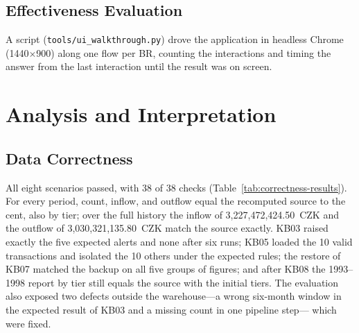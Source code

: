 \documentclass[peerreview]{IEEEtran}
\begin{document}
\subsection{Effectiveness Evaluation}
A script (\texttt{tools/ui\_walkthrough.py}) drove the application in headless Chrome
(1440$\times$900) along one flow per BR, counting the interactions and timing the answer from
the last interaction until the result was on screen.


\section{Analysis and Interpretation}
\label{sec:analysis}

\subsection{Data Correctness}
All eight scenarios passed, with 38 of 38 checks (Table~\ref{tab:correctness-results}). For
every period, count, inflow, and outflow equal the recomputed source to the cent, also by
tier; over the full history the inflow of 3,227,472,424.50~CZK and the outflow of
3,030,321,135.80~CZK match the source exactly. KB03 raised exactly the five expected alerts
and none after six runs; KB05 loaded the 10 valid transactions and isolated the 10 others
under the expected rules; the restore of KB07 matched the backup on all five groups of
figures; and after KB08 the 1993--1998 report by tier still equals the source with the
initial tiers. The evaluation also exposed two defects outside the warehouse---a wrong
six-month window in the expected result of KB03 and a missing count in one pipeline step---
which were fixed.
\end{document}
